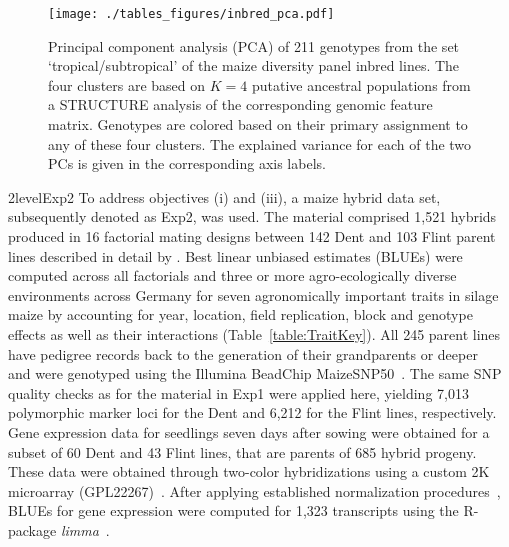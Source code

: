 \documentclass[12pt,titlepage]{article}
\begin{document}
\begin{figure}[H]
  \centering
  \texttt{[image: ./tables\_figures/inbred\_pca.pdf]}
  \caption{
  Principal component analysis (PCA) of 211 genotypes from the set
  `tropical/subtropical' of the maize diversity panel inbred lines.
  The four clusters are based on $K=4$ putative ancestral populations from a
  STRUCTURE analysis of the corresponding genomic feature matrix.
  Genotypes are colored based on their primary assignment to any of these four
  clusters.
  The explained variance for each of the two PCs is given in the corresponding
  axis labels.
}
\label{fig:inbred-pca}
\end{figure}


\Genetics2level{Exp2}
To address objectives (i) and (iii), a maize hybrid data set, subsequently
denoted as Exp2, was used.
The material comprised 1,521 hybrids produced in 16 factorial mating designs
between 142 Dent and 103 Flint parent lines described in detail by
.
Best linear unbiased estimates (BLUEs) were computed across all factorials and 
three or more agro-ecologically diverse environments across Germany for seven
agronomically important traits in silage maize by accounting for year, location,
field replication, block and genotype effects as well as their interactions
(Table~\ref{table:TraitKey}).
All 245 parent lines have pedigree records back to the generation of their 
grandparents or deeper~\cite{Westhues2017} and were genotyped using the Illumina 
BeadChip MaizeSNP50~\cite{Ganal2011}.
The same SNP quality checks as for the material in Exp1 were applied here,
yielding 7,013 polymorphic marker loci for the Dent and 6,212 for the Flint
lines, respectively.
Gene expression data for seedlings seven days after sowing were obtained for a 
subset of 60 Dent and 43 Flint lines, that are parents of 685 hybrid progeny.
These data were obtained through two-color hybridizations using a custom 2K 
microarray (GPL22267)~\cite{Westhues2017}.
After applying established normalization procedures~\cite{Smyth2003,Ritchie2007},
BLUEs for gene expression were computed for 1,323 transcripts
\cite{Westhues2017} using the R-package \emph{limma}~\cite{Ritchie2015a}.
\end{document}
